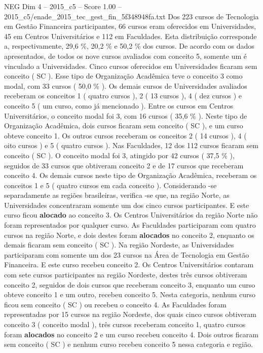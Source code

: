 \begin{textsample}{NEG Dim 4 – 2015\_c5 – Score 1.00 – 2015\_c5/enade\_2015\_tec\_gest\_fin\_5f348948fa.txt}
Dos 223 cursos de Tecnologia em Gestão Financeira participantes, 66 cursos eram oferecidos em Universidades, 45 em Centros Universitários e 112 em Faculdades.
Esta distribuição corresponde a, respectivamente, 29,6 \%, 20,2 \% e 50,2 \% dos cursos.
De acordo com os dados apresentados, de todos os nove cursos avaliados com conceito 5, somente um é vinculado a Universidades.
Cinco cursos oferecidos em Universidades ficaram sem conceito ( SC ).
Esse tipo de Organização Acadêmica teve o conceito 3 como modal, com 33 cursos ( 50,0 \% ).
Os demais cursos de Universidades avaliados receberam os conceitos 1 ( quatro cursos ), 2 ( 13 cursos ), 4 ( dez cursos ) e conceito 5 ( um curso, como já mencionado ).
Entre os cursos em Centros Universitários, o conceito modal foi 3, com 16 cursos ( 35,6 \% ).
Neste tipo de Organização Acadêmica, dois cursos ficaram sem conceito ( SC ), e um curso obteve conceito 1.
Os outros cursos receberam os conceitos 2 ( 14 cursos ), 4 ( oito cursos ) e 5 ( quatro cursos ).
Nas Faculdades, 12 dos 112 cursos ficaram sem conceito ( SC ).
O conceito modal foi 3, atingido por 42 cursos ( 37,5 \% ), seguidos de 33 cursos que obtiveram conceito 2 e de 17 cursos que receberam conceito 4.
Os demais cursos neste tipo de Organização Acadêmica, receberam os conceitos 1 e 5 ( quatro cursos em cada conceito ).
Considerando -se separadamente as regiões brasileiras, verifica -se que, na região Norte, as Universidades concentraram somente um dos cinco cursos participantes.
E este curso ficou \textbf{alocado} ao conceito 3.
Os Centros Universitários da região Norte não foram representados por qualquer curso.
As Faculdades participaram com quatro cursos na região Norte, e dois destes foram \textbf{alocados} no conceito 2, enquanto os demais ficaram sem conceito ( SC ).
Na região Nordeste, as Universidades participaram com somente um dos 23 cursos na Área de Tecnologia em Gestão Financeira.
E este curso recebeu conceito 2.
Os Centros Universitários contaram com sete cursos participantes na região Nordeste, destes três cursos obtiveram conceito 2, seguidos de dois cursos que receberam conceito 3, enquanto um curso obteve conceito 1 e um outro, recebeu conceito 5.
Nesta categoria, nenhum curso ficou sem conceito ( SC ) ou recebeu o conceito 4.
As Faculdades foram representadas por 15 cursos na região Nordeste, dos quais cinco cursos obtiveram conceito 3 ( conceito modal ), três cursos receberam conceito 1, quatro cursos foram \textbf{alocados} no conceito 2 e um curso recebeu conceito 4.
Dois outros ficaram sem conceito ( SC ) e nenhum curso recebeu conceito 5 nessa categoria e região.

\end{textsample}
